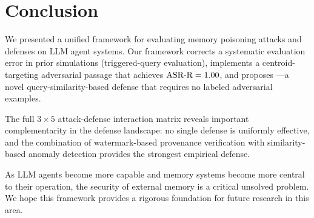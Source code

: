 \section{Conclusion}
\label{sec:conclusion}

We presented a unified framework for evaluating memory poisoning attacks
and defenses on LLM agent systems.  Our framework corrects a systematic
evaluation error in prior \agentpoison{} simulations (triggered-query
evaluation), implements a centroid-targeting adversarial passage that
achieves $\text{ASR-R}=1.00$, and proposes \sad{}---a novel query-similarity-based
defense that requires no labeled adversarial examples.

The full $3 \times 5$ attack-defense interaction matrix reveals important
complementarity in the defense landscape: no single defense is uniformly
effective, and the combination of watermark-based provenance verification
with similarity-based anomaly detection provides the strongest empirical
defense.

As LLM agents become more capable and memory systems become more central
to their operation, the security of external memory is a critical unsolved
problem.  We hope this framework provides a rigorous foundation for future
research in this area.
